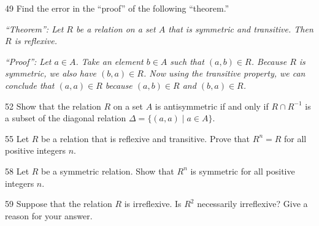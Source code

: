 \documentclass[11pt]{article}
\begin{document}
\begin{exercise}{49}
    Find the error in the ``proof'' of the following ``theorem.''

    \textit{``Theorem'': Let $R$ be a relation on a set $A$ that is
    symmetric and transitive. Then $R$ is reflexive.}

    \textit{``Proof'': Let $a \in A$. Take an element $b \in A$ such
    that $(a,b) \in R$. Because $R$ is symmetric, we also have
    $(b,a) \in R$. Now using the transitive property, we can
    conclude that $(a,a) \in R$ because $(a,b) \in R$ and
    $(b,a) \in R$.}
\end{exercise}

\begin{exercise}{52}
    Show that the relation $R$ on a set $A$ is antisymmetric if and
    only if $R \cap R^{-1}$ is a subset of the diagonal relation
    $\Delta = \{(a,a) \mid a \in A\}$.
\end{exercise}

\begin{exercise}{55}
    Let $R$ be a relation that is reflexive and transitive. Prove
    that $R^n = R$ for all positive integers $n$.
\end{exercise}

\begin{exercise}{58}
    Let $R$ be a symmetric relation. Show that $R^n$ is symmetric for
    all positive integers $n$.
\end{exercise}

\begin{exercise}{59}
    Suppose that the relation $R$ is irreflexive. Is $R^2$
    necessarily irreflexive? Give a reason for your answer.
\end{exercise}
\end{document}
